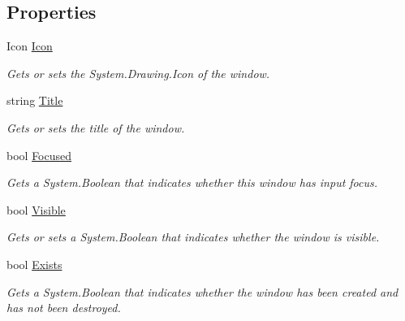 \subsection*{Properties}
\begin{DoxyCompactItemize}
\item 
Icon \hyperlink{interface_open_t_k_1_1_i_native_window_a16cffc51a5dd62c9d9dbf9a089620754}{Icon}
\begin{DoxyCompactList}\small\item\em Gets or sets the System.\-Drawing.\-Icon of the window. \end{DoxyCompactList}\item 
string \hyperlink{interface_open_t_k_1_1_i_native_window_acc6e79eb06f9e7d725f6eac5ac1df71d}{Title}
\begin{DoxyCompactList}\small\item\em Gets or sets the title of the window. \end{DoxyCompactList}\item 
bool \hyperlink{interface_open_t_k_1_1_i_native_window_aaa2ef631c8bd4bcbef3374dfaeb50299}{Focused}
\begin{DoxyCompactList}\small\item\em Gets a System.\-Boolean that indicates whether this window has input focus. \end{DoxyCompactList}\item 
bool \hyperlink{interface_open_t_k_1_1_i_native_window_ac455c50c69983d4a26e7ed61336290d8}{Visible}
\begin{DoxyCompactList}\small\item\em Gets or sets a System.\-Boolean that indicates whether the window is visible. \end{DoxyCompactList}\item 
bool \hyperlink{interface_open_t_k_1_1_i_native_window_af207962d0e6a21f4a280e66844cc3805}{Exists}
\begin{DoxyCompactList}\small\item\em Gets a System.\-Boolean that indicates whether the window has been created and has not been destroyed. \end{DoxyCompactList}\item 

\end{DoxyCompactItemize}
